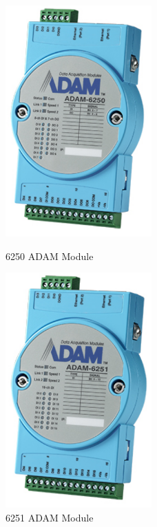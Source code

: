         \begin{figure}[H]
        \centering
        \begin{minipage}{0.4\textwidth}
            \centering
            \includegraphics[width = 0.5\textwidth]{2_images/adam6250.png}
            \caption{6250 ADAM Module~\cite{6250Data}}
            \label{fig:adam6250}
        \end{minipage}\hfill
        \begin{minipage}{0.4\textwidth}
            \centering
            \includegraphics[width = 0.5\textwidth]{2_images/adam6251.png}
            \caption{6251 ADAM Module~\cite{6251Data}}
            \label{fig:adam6251}
        \end{minipage}\hfill            
        \end{figure}   
    
